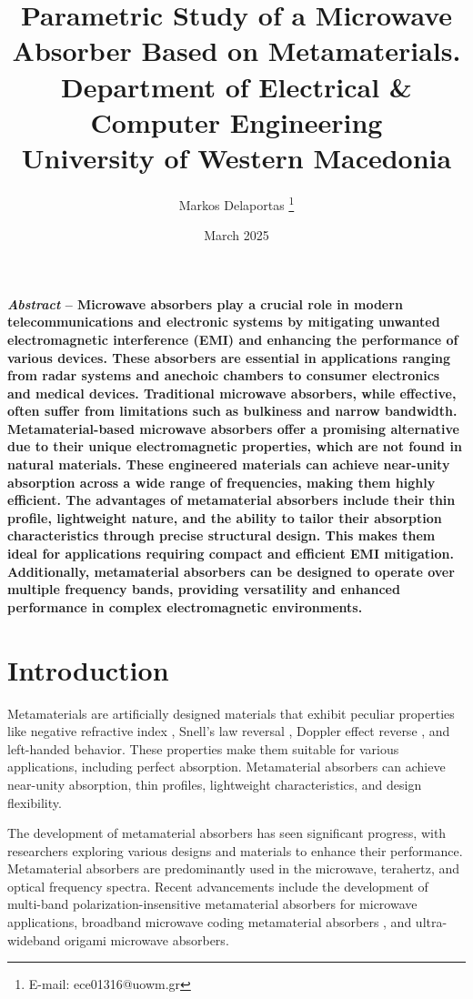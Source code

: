 \documentclass[12pt]{article}
\title{ \textsf{Parametric Study of a Microwave Absorber Based on Metamaterials.}\\
    \textsf{\Large Department of Electrical \& Computer Engineering}\\
    \textsf{\large University of Western Macedonia}
} \author{\textsf{Markos Delaportas} \footnote{E-mail: ece01316@uowm.gr}}
\date{\textsf{March 2025}}
\begin{document}
\maketitle

\textbf{ \textit{Abstract} -- Microwave absorbers play a crucial role in modern
    telecommunications and electronic systems by mitigating unwanted electromagnetic
    interference (EMI) and enhancing the performance of various devices. These absorbers are
    essential in applications ranging from radar systems and anechoic chambers to consumer
    electronics and medical devices. Traditional microwave absorbers, while effective, often
    suffer from limitations such as bulkiness and narrow bandwidth. Metamaterial-based
    microwave absorbers offer a promising alternative due to their unique electromagnetic
    properties, which are not found in natural materials. These engineered materials can
    achieve near-unity absorption across a wide range of frequencies, making them highly
    efficient. The advantages of metamaterial absorbers include their thin profile,
    lightweight nature, and the ability to tailor their absorption characteristics through
    precise structural design. This makes them ideal for applications requiring compact and
    efficient EMI mitigation. Additionally, metamaterial absorbers can be designed to operate
    over multiple frequency bands, providing versatility and enhanced performance in complex
    electromagnetic environments.}

{\let\clearpage\relax \tableofcontents} \thispagestyle{empty}    


\section{\textsf{Introduction}}
    Metamaterials are artificially designed materials that
    exhibit peculiar properties like negative refractive index \cite{veselago_left_2006}, 
    Snell's law reversal \cite{wang_simulationguided_2024}, Doppler effect reverse
    \cite{jha_design_2018}, and left-handed behavior. These properties make them suitable
    for various applications, including perfect absorption. Metamaterial absorbers can
    achieve near-unity absorption, thin profiles, lightweight characteristics, and design
    flexibility.

    The development of metamaterial absorbers has seen significant progress, with
    researchers exploring various designs and materials to enhance their performance.
    Metamaterial absorbers are predominantly used in the microwave, terahertz, and optical
    frequency spectra. Recent advancements include the development of multi-band
    polarization-insensitive metamaterial absorbers for microwave applications, broadband
    microwave coding metamaterial absorbers \cite{tran_broadband_2020}, and ultra-wideband
    origami microwave absorbers\cite{biswas_ultra-wideband_2022}.
\end{document}
